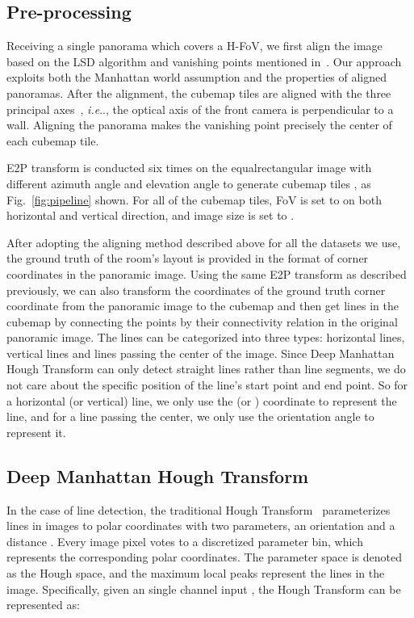 \documentclass[runningheads]{llncs}
\makeatletter
\DeclareRobustCommand\onedot{\futurelet\@let@token\@onedot}
\def\@onedot{\ifx\@let@token.\else.\null\fi\xspace}
\def\ie{\emph{i.e}\onedot} \def\Ie{\emph{I.e}\onedot}
\makeatother
\begin{document}
\subsection{Pre-processing}\label{sec:pre}
Receiving a single panorama which covers a  H-FoV, we first align the image based on the LSD algorithm and vanishing points mentioned in~\cite{zou2018layoutnet,sun2019horizonnet}. Our approach exploits both the Manhattan world assumption and the properties of aligned panoramas. After the alignment, the cubemap tiles are aligned with the three principal axes~\cite{coughlan1999manhattan}, \ie, the optical axis of the front camera is perpendicular to a wall. Aligning the panorama makes the vanishing point precisely the center of each cubemap tile.



E2P transform is conducted six times on the equalrectangular image with different azimuth angle and elevation angle to generate cubemap tiles , as Fig.~\ref{fig:pipeline} shown. For 
all of the cubemap tiles, FoV is set to  on both horizontal and vertical direction, and image size is set to .


After adopting the aligning method described above for all the datasets we use, the ground truth of the room’s layout is provided in the format of corner coordinates in the panoramic image.
Using the same E2P transform as described previously, we can also transform the coordinates of the ground truth corner coordinate from the panoramic image to the cubemap and then get lines in the cubemap by connecting the points by their connectivity relation in the original panoramic image.
The lines can be categorized into three types: horizontal lines, vertical lines and lines passing the center of the image. 
Since Deep Manhattan Hough Transform can only detect straight lines rather than line segments, we do not care about the specific position of the line's start point and end point. So for a horizontal (or vertical) line, we only use the  (or ) coordinate to represent the line, and for a line passing the center, we only use the orientation angle  to represent it.






\subsection{Deep Manhattan Hough Transform}\label{sec:manhattanhough}
In the case of line detection, the traditional Hough Transform~\cite{hough1962method} parameterizes lines in images to polar coordinates with two parameters, an orientation  and a distance . Every image pixel votes to a discretized parameter bin, which represents the corresponding polar coordinates. The parameter space is denoted as the Hough space, and the maximum local peaks represent the lines in the image. 
Specifically, given an single channel input , the Hough Transform  can be represented as:
\end{document}
